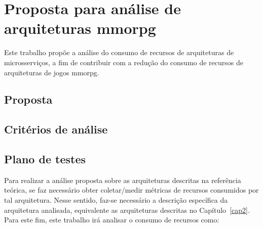 \chapter{Proposta para análise de arquiteturas \ac{mmorpg}}
\label{cap3}


Este trabalho propõe a análise do consumo de recursos de arquiteturas de microsserviços, a fim de contribuir com a redução do consumo de recursos de arquiteturas de jogos \ac{mmorpg}.


\section{Proposta}


\section{Critérios de análise}


\section {Plano de testes}

Para realizar a análise proposta sobre as arquiteturas descritas na referência teórica, se faz necessário obter coletar/medir métricas de recursos consumidos por tal arquitetura.
%
Nesse sentido, faz-se necessário a descrição específica da arquitetura analisada, equivalente as arquiteturas descritas no Capítulo~\ref{cap2}.
%
Para este fim, este trabalho irá analisar o consumo de recursos como:

